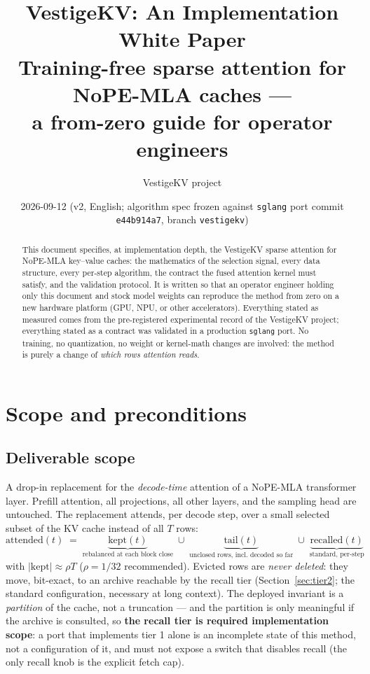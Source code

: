 \documentclass[11pt]{article}
\title{VestigeKV: An Implementation White Paper\\
\large Training-free sparse attention for NoPE-MLA caches ---\\
a from-zero guide for operator engineers}
\author{VestigeKV project}
\date{2026-09-12 \quad (v2, English; algorithm spec frozen against
\texttt{sglang} port commit \texttt{e44b914a7}, branch \texttt{vestigekv})}
\newcommand{\kept}{\mathrm{kept}}
\begin{document}
\maketitle

\begin{abstract}
This document specifies, at implementation depth, the VestigeKV sparse
attention for NoPE-MLA key--value caches: the mathematics of the selection
signal, every data structure, every per-step algorithm, the contract the
fused attention kernel must satisfy, and the validation protocol. It is
written so that an operator engineer holding only this document and stock
model weights can reproduce the method from zero on a new hardware platform
(GPU, NPU, or other accelerators). Everything stated as measured comes from
the pre-registered experimental record of the VestigeKV project; everything
stated as a contract was validated in a production \texttt{sglang} port.
No training, no quantization, no weight or kernel-math changes are involved:
the method is purely a change of \emph{which rows attention reads}.
\end{abstract}

\tableofcontents

\section{Scope and preconditions}

\subsection{Deliverable scope}
A drop-in replacement for the \emph{decode-time} attention of a NoPE-MLA
transformer layer. Prefill attention, all projections, all other layers, and
the sampling head are untouched. The replacement attends, per decode step,
over a small selected subset of the KV cache instead of all $T$ rows:
\[
\mathrm{attended}(t) \;=\;
\underbrace{\kept(t)}_{\text{rebalanced at each block close}}
\;\cup\;
\underbrace{\mathrm{tail}(t)}_{\text{unclosed rows, incl.\ decoded so far}}
\;\cup\;
\underbrace{\mathrm{recalled}(t)}_{\text{standard, per-step}}
\]
with $|\kept| \approx \rho T$ ($\rho = 1/32$ recommended). Evicted rows are
\emph{never deleted}: they move, bit-exact, to an archive reachable by the
recall tier (Section~\ref{sec:tier2}; the standard configuration, necessary at long context). The deployed invariant is a
\emph{partition} of the cache, not a truncation --- and the partition is
only meaningful if the archive is consulted, so \textbf{the recall tier is
required implementation scope}: a port that implements tier 1 alone is an
incomplete state of this method, not a configuration of it, and must not
expose a switch that disables recall (the only recall knob is the explicit
fetch cap).
\end{document}
